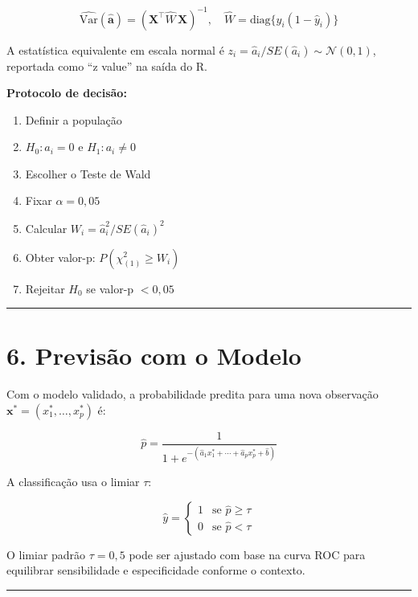 \documentclass[
  letterpaper,
  DIV=11,
  numbers=noendperiod]{scrartcl}
\providecommand{\tightlist}{%
  \setlength{\itemsep}{0pt}\setlength{\parskip}{0pt}}
\begin{document}
\[\widehat{\text{Var}}(\hat{\mathbf{a}}) = \left(\mathbf{X}^\top \widehat{W}\, \mathbf{X}\right)^{-1}, \quad \widehat{W} = \text{diag}\{\hat{y}_i(1-\hat{y}_i)\}\]

A estatística equivalente em escala normal é
\(z_i = \hat{a}_i / SE(\hat{a}_i) \sim \mathcal{N}(0,1)\), reportada
como ``z value'' na saída do R.

\textbf{Protocolo de decisão:}

\begin{enumerate}
\def\labelenumi{\arabic{enumi}.}
\tightlist
\item
  Definir a população
\item
  \(H_0: a_i = 0\) e \(H_1: a_i \neq 0\)
\item
  Escolher o Teste de Wald
\item
  Fixar \(\alpha = 0{,}05\)
\item
  Calcular \(W_i = \hat{a}_i^2 / SE(\hat{a}_i)^2\)
\item
  Obter valor-p: \(P(\chi^2_{(1)} \geq W_i)\)
\item
  Rejeitar \(H_0\) se valor-p \(< 0{,}05\)
\end{enumerate}

\begin{center}\rule{0.5\linewidth}{0.5pt}\end{center}

\section{6. Previsão com o Modelo}\label{previsuxe3o-com-o-modelo}

Com o modelo validado, a probabilidade predita para uma nova observação
\(\mathbf{x}^* = (x_1^*, \ldots, x_p^*)\) é:

\[\hat{p} = \frac{1}{1 + e^{-(\hat{a}_1 x_1^* + \cdots + \hat{a}_p x_p^* + \hat{b})}}\]

A classificação usa o limiar \(\tau\):

\[\hat{y} = \begin{cases} 1 & \text{se } \hat{p} \geq \tau \\ 0 & \text{se } \hat{p} < \tau \end{cases}\]

O limiar padrão \(\tau = 0{,}5\) pode ser ajustado com base na curva ROC
para equilibrar sensibilidade e especificidade conforme o contexto.

\begin{center}\rule{0.5\linewidth}{0.5pt}\end{center}
\end{document}
